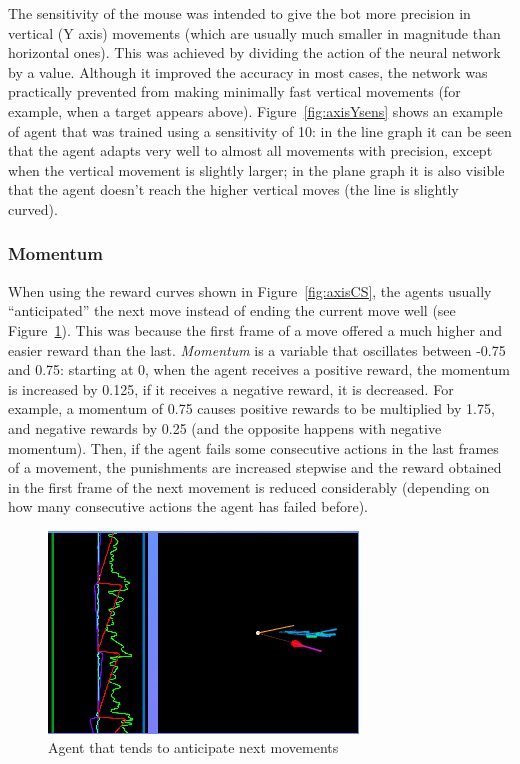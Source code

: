 The sensitivity of the mouse was intended to give the bot more precision in vertical (Y axis) movements (which are usually much smaller in magnitude than horizontal ones). This was achieved by dividing the action of the neural network by a value. Although it improved the accuracy in most cases, the network was practically prevented from making minimally fast vertical movements (for example, when a target appears above). Figure~\ref{fig:axisYsens} shows an example of agent that was trained using a sensitivity of 10: in the line graph it can be seen that the agent adapts very well to almost all movements with precision, except when the vertical movement is slightly larger; in the plane graph it is also visible that the agent doesn't reach the higher vertical moves (the line is slightly curved).

\subsubsection{Momentum}

When using the reward curves shown in Figure~\ref{fig:axisCS}, the agents usually ``anticipated'' the next move instead of ending the current move well (see Figure~\ref{fig:axisMomentum}). This was because the first frame of a move offered a much higher and easier reward than the last. \emph{Momentum} is a variable that oscillates between -0.75 and 0.75: starting at 0, when the agent receives a positive reward, the momentum is increased by 0.125, if it receives a negative reward, it is decreased. For example, a momentum of 0.75 causes positive rewards to be multiplied by 1.75, and negative rewards by 0.25 (and the opposite happens with negative momentum). Then, if the agent fails some consecutive actions in the last frames of a movement, the punishments are increased stepwise and the reward obtained in the first frame of the next movement is reduced considerably (depending on how many consecutive actions the agent has failed before).

\begin{figure}[h]
  \centering
		\includegraphics[width=.6\textwidth]{img/axisMomentum.png}
  \caption{Agent that tends to anticipate next movements}
  \label{fig:axisMomentum}
\end{figure}

